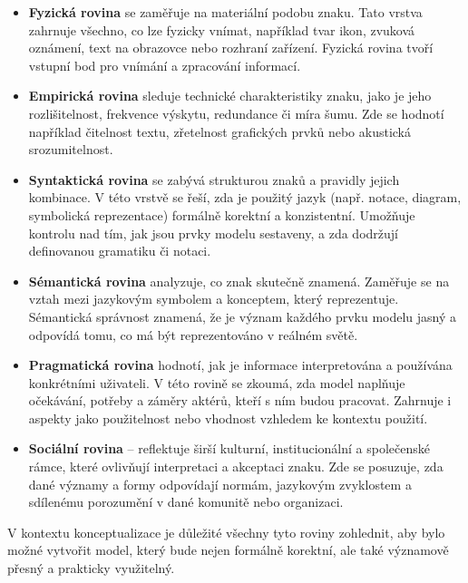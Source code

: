 \begin{itemize}
  \item \textbf{Fyzická rovina} se zaměřuje na materiální podobu znaku. Tato vrstva zahrnuje všechno, co lze fyzicky vnímat, například tvar ikon, zvuková oznámení, text na obrazovce nebo rozhraní zařízení. Fyzická rovina tvoří vstupní bod pro vnímání a zpracování informací.

  \item \textbf{Empirická rovina} sleduje technické charakteristiky znaku, jako je jeho rozlišitelnost, frekvence výskytu, redundance či míra šumu. Zde se hodnotí například čitelnost textu, zřetelnost grafických prvků nebo akustická srozumitelnost.

  \item \textbf{Syntaktická rovina} se zabývá strukturou znaků a pravidly jejich kombinace. V této vrstvě se řeší, zda je použitý jazyk (např. notace, diagram, symbolická reprezentace) formálně korektní a konzistentní. Umožňuje kontrolu nad tím, jak jsou prvky modelu sestaveny, a zda dodržují definovanou gramatiku či notaci.

  \item \textbf{Sémantická rovina} analyzuje, co znak skutečně znamená. Zaměřuje se na vztah mezi jazykovým symbolem a konceptem, který reprezentuje. Sémantická správnost znamená, že je význam každého prvku modelu jasný a odpovídá tomu, co má být reprezentováno v reálném světě.

  \item \textbf{Pragmatická rovina} hodnotí, jak je informace interpretována a používána konkrétními uživateli. V této rovině se zkoumá, zda model naplňuje očekávání, potřeby a záměry aktérů, kteří s ním budou pracovat. Zahrnuje i aspekty jako použitelnost nebo vhodnost vzhledem ke kontextu použití.

  \item \textbf{Sociální rovina} – reflektuje širší kulturní, institucionální a společenské rámce, které ovlivňují interpretaci a akceptaci znaku. Zde se posuzuje, zda dané významy a formy odpovídají normám, jazykovým zvyklostem a sdílenému porozumění v dané komunitě nebo organizaci. \cite{Ferreira2007}
\end{itemize}
V kontextu konceptualizace je důležité všechny tyto roviny zohlednit, aby bylo možné vytvořit model, který bude nejen formálně korektní, ale také významově přesný a prakticky využitelný.


